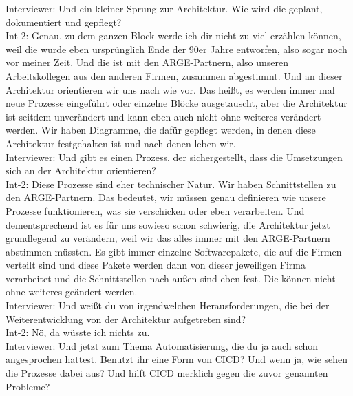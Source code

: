 Interviewer: Und ein kleiner Sprung zur Architektur. Wie wird die geplant, dokumentiert und gepflegt?\\
Int-2: Genau, zu dem ganzen Block werde ich dir nicht zu viel erzählen können, weil die wurde eben ursprünglich Ende der 90er Jahre entworfen, also sogar noch vor meiner Zeit. Und die ist mit den ARGE-Partnern, also unseren Arbeitskollegen aus den anderen Firmen, zusammen abgestimmt. Und an dieser Architektur orientieren wir uns nach wie vor. Das heißt, es werden immer mal neue Prozesse eingeführt oder einzelne Blöcke ausgetauscht, aber die Architektur ist seitdem unverändert und kann eben auch nicht ohne weiteres verändert werden. Wir haben Diagramme, die dafür gepflegt werden, in denen diese Architektur festgehalten ist und nach denen leben wir. \\
Interviewer: Und gibt es einen Prozess, der sichergestellt, dass die Umsetzungen sich an der Architektur orientieren?\\
Int-2: Diese Prozesse sind eher technischer Natur. Wir haben Schnittstellen zu den ARGE-Partnern. Das bedeutet, wir müssen genau definieren wie unsere Prozesse funktionieren, was sie verschicken oder eben verarbeiten. Und dementsprechend ist es für uns sowieso schon schwierig, die Architektur jetzt grundlegend zu verändern, weil wir das alles immer mit den ARGE-Partnern abstimmen müssten. Es gibt immer einzelne Softwarepakete, die auf die Firmen verteilt sind und diese Pakete werden dann von dieser jeweiligen Firma verarbeitet und die Schnittstellen nach außen sind eben fest. Die können nicht ohne weiteres geändert werden. \\
Interviewer: Und weißt du von irgendwelchen Herausforderungen, die bei der Weiterentwicklung von der Architektur aufgetreten sind? \\
Int-2: Nö, da wüsste ich nichts zu. \\
Interviewer: Und jetzt zum Thema Automatisierung, die du ja auch schon angesprochen hattest. Benutzt ihr eine Form von CICD? Und wenn ja, wie sehen die Prozesse dabei aus? Und hilft CICD merklich gegen die zuvor genannten Probleme? \\
